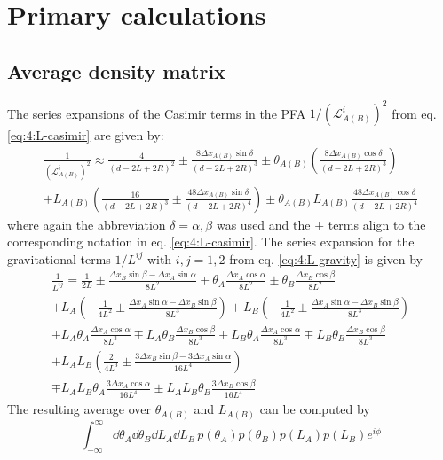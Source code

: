 \chapter{Primary calculations}

\section{Average density matrix}\label{apx:average-density}

The series expansions of the Casimir terms in the PFA $1/(\mathscr{L}^i_{A(B)})^2$ from eq. \eqref{eq:4:L-casimir} are given by:
\begin{multline}
  \frac{1}{(\mathscr{L}^i_{A(B)})^2} \approx \frac{4}{(d-2L+2R)^2} \pm \frac{8 \Delta x_{A(B)}\sin\delta}{(d-2L+2R)^3}
  \pm \theta_{A(B)}\left(\frac{8\Delta x_{A(B)} \cos\delta}{(d-2L+2R)^3}\right) \\
  + L_{A(B)}\left(\frac{16}{(d-2L+2R)^3} \pm \frac{48\Delta x_{A(B)} \sin\delta}{(d-2L+2R)^4}\right) \pm \theta_{A(B)}L_{A(B)}\frac{48\Delta x_{A(B)} \cos\delta}{(d-2L+2R)^4}
\end{multline}
where again the abbreviation $\delta = \alpha,\beta$ was used and the $\pm$ terms align to the corresponding notation in eq. \eqref{eq:4:L-casimir}. The series expansion for the gravitational terms $1/L^{ij}$ with $i,j = 1,2$ from eq. \eqref{eq:4:L-gravity} is given by
\begin{multline}
  \frac{1}{L^{ij}} = \frac{1}{2L} \pm \frac{\Delta x_B \sin\beta - \Delta x_A \sin\alpha}{8L^2} \mp \theta_A\frac{\Delta x_A\cos\alpha}{8L^2} \pm \theta_B\frac{\Delta x_B\cos\beta}{8L^2} \\
  + L_A \left(-\frac{1}{4L^2} \pm \frac{\Delta x_A \sin\alpha-\Delta x_B \sin\beta}{8L^3}\right)
  + L_B \left(-\frac{1}{4L^2} \pm \frac{\Delta x_A \sin\alpha-\Delta x_B \sin\beta}{8L^3}\right) \\
  \pm L_A \theta_A \frac{\Delta x_A \cos\alpha}{8L^3} \mp L_A \theta_B \frac{\Delta x_B \cos\beta}{8L^3}
  \pm L_B \theta_A \frac{\Delta x_A \cos\alpha}{8L^3} \mp L_B \theta_B \frac{\Delta x_B \cos\beta}{8L^3} \\
  + L_A L_B \left(\frac{2}{4L^3} \pm \frac{3\Delta x_B \sin\beta - 3 \Delta x_A \sin\alpha}{16L^4}\right) \\
  \mp L_A L_B \theta_A \frac{3 \Delta x_A \cos\alpha}{16L^4} \pm L_A L_B \theta_B \frac{3 \Delta x_B \cos\beta}{16L^4}
\end{multline}
The resulting average over $\theta_{A(B)}$ and $L_{A(B)}$ can be computed by
\begin{equation}\label{eq:apx:average-density-element}
  \int_{-\infty}^{\infty} \dd \theta_A \dd \theta_B \dd L_A \dd L_B \, p(\theta_A) p(\theta_B) p(L_A) p(L_B) e^{i \phi}
\end{equation}
